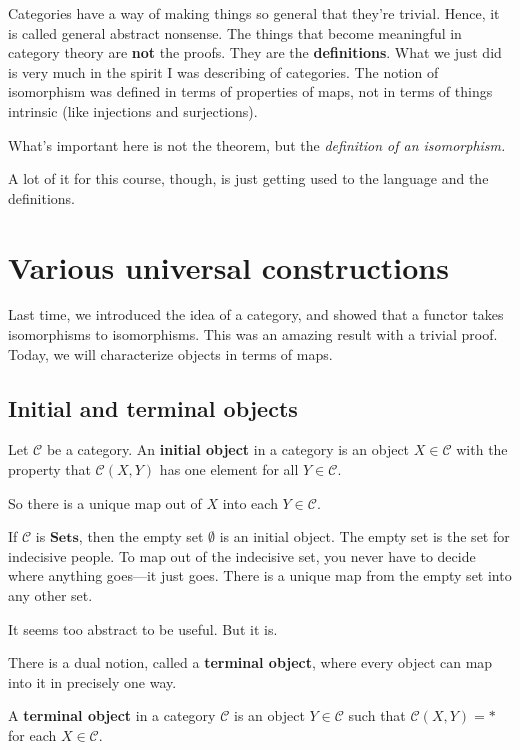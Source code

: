Categories have a way of making things so general that they're trivial. Hence,
it is called general abstract nonsense. The things that become meaningful in
category theory are \textbf{not} the proofs. They are the
\textbf{definitions}. What we just did is very much in the spirit I was
describing of categories. The notion of isomorphism was defined in terms of
properties of maps, not in terms of things intrinsic (like injections and
surjections).

What's important here is not the theorem, but the \emph{definition of an
isomorphism.}

A lot of it for this course, though, is just getting used to the language and
the definitions.

\section{Various universal constructions}

Last time, we introduced the idea of a category, and showed that a functor
takes isomorphisms to isomorphisms. This was an amazing result with a trivial
proof. Today, we will characterize objects in terms of maps.
\subsection{Initial and terminal objects}

\begin{definition} Let $\mathcal{C}$ be a category. An \textbf{initial object}
in a category is an object $X \in \mathcal{C}$ with the property that
$\mathcal{C}(X, Y)$ has one element for all $Y \in \mathcal{C}$.

So there is a unique map out of $X$ into each $Y \in \mathcal{C}$.
\end{definition}

\begin{example} If $\mathcal{C}$ is $\mathbf{Sets}$, then the empty set
$\emptyset$ is an initial object. The empty set is the set for indecisive
people. To map out of the indecisive set, you never have to decide where
anything goes---it just goes. There is a unique map from the empty set into
any other set. \end{example}

It seems too abstract to be useful. But it is.

There is a dual notion, called a \textbf{terminal object}, where every object
can map into it in precisely one way. \begin{definition} A \textbf{terminal
object} in a category $\mathcal{C}$ is an object $Y \in \mathcal{C}$ such that
$\mathcal{C}(X, Y) = \ast$ for each $X \in \mathcal{C}$. \end{definition}

